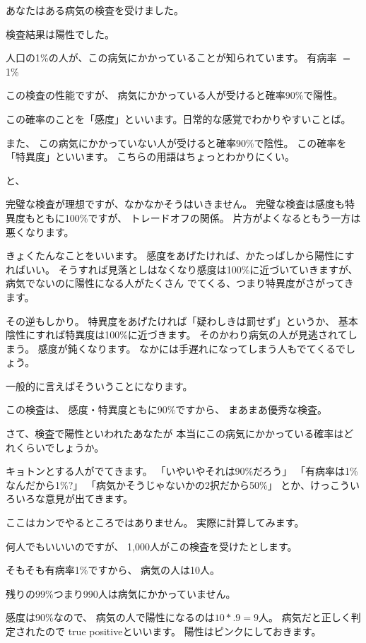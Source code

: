 \documentclass[uplatex,jis2004,dvipdfmx,12pt]{jsarticle}
\begin{document}
あなたはある病気の検査を受けました。

検査結果は陽性でした。

人口の1\%の人が、この病気にかかっていることが知られています。
有病率 $=$ 1\%

この検査の性能ですが、
病気にかかっている人が受けると確率90\%で陽性。

この確率のことを「感度」といいます。日常的な感覚でわかりやすいことば。

また、
この病気にかかっていない人が受けると確率90\%で陰性。
この確率を「特異度」といいます。
こちらの用語はちょっとわかりにくい。

と、

完璧な検査が理想ですが、なかなかそうはいきません。
完璧な検査は感度も特異度もともに100\%ですが、
トレードオフの関係。
片方がよくなるともう一方は悪くなります。

きょくたんなことをいいます。
感度をあげたければ、かたっぱしから陽性にすればいい。
そうすれば見落としはなくなり感度は100\%に近づいていきますが、
病気でないのに陽性になる人がたくさん
でてくる、つまり特異度がさがってきます。

その逆もしかり。
特異度をあげたければ「疑わしきは罰せず」というか、
基本陰性にすれば特異度は100\%に近づきます。
そのかわり病気の人が見逃されてしまう。
感度が鈍くなります。
なかには手遅れになってしまう人もでてくるでしょう。

一般的に言えばそういうことになります。

この検査は、
感度・特異度ともに90\%ですから、
まあまあ優秀な検査。


さて、検査で陽性といわれたあなたが
本当にこの病気にかかっている確率はどれくらいでしょうか。

キョトンとする人がでてきます。
「いやいやそれは90\%だろう」
「有病率は1\%なんだから1\%?」
「病気かそうじゃないかの2択だから50\%」
とか、けっこういろいろな意見が出てきます。

ここはカンでやるところではありません。
実際に計算してみます。


何人でもいいいのですが、
1,000人がこの検査を受けたとします。


そもそも有病率1\%ですから、
病気の人は10人。

残りの99\%つまり990人は病気にかかっていません。

感度は90\%なので、
病気の人で陽性になるのは$10*.9=9$人。
病気だと正しく判定されたので
true positiveといいます。
陽性はピンクにしておきます。
\end{document}
